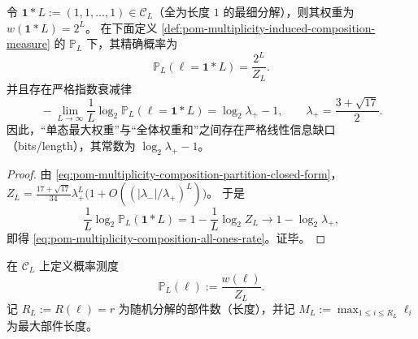 \begin{corollary}\label{cor:pom-multiplicity-composition-all-ones-exponential-rarity}
令 \(\boldsymbol{1}*L:=(1,1,\dots,1)\in\mathcal{C}_L\)（全为长度 \(1\) 的最细分解），则其权重为 \(w(\boldsymbol{1}*L)=2^L\)。
在下面定义 \ref{def:pom-multiplicity-induced-composition-measure} 的 \(\mathbb{P}_L\) 下，其精确概率为
\[
\mathbb{P}_L(\boldsymbol{\ell}=\boldsymbol{1}*L)=\frac{2^L}{Z_L}.
\]
并且存在严格指数衰减律
\begin{equation}\label{eq:pom-multiplicity-composition-all-ones-rate}
\boxed{\;
-\lim_{L\to\infty}\frac1L\log_2\mathbb{P}_L(\boldsymbol{\ell}=\boldsymbol{1}*L)
=\log_2\lambda_+-1,
\qquad \lambda_+=\frac{3+\sqrt{17}}{2}.\;}
\end{equation}
因此，“单态最大权重”与“全体权重和”之间存在严格线性信息缺口（bits/length），其常数为 \(\log_2\lambda_+-1\)。
\end{corollary}
\begin{proof}
由 \eqref{eq:pom-multiplicity-composition-partition-closed-form}，
\(
Z_L=\frac{17+\sqrt{17}}{34}\lambda_+^L\bigl(1+O((|\lambda_-|/\lambda_+)^L)\bigr)
\)。
于是
\[
\frac1L\log_2\mathbb{P}_L(\boldsymbol{1}*L)
=1-\frac1L\log_2 Z_L
\longrightarrow
1-\log_2\lambda_+,
\]
即得 \eqref{eq:pom-multiplicity-composition-all-ones-rate}。证毕。
\end{proof}

\begin{definition}[多重度诱导的典型分解测度]\label{def:pom-multiplicity-induced-composition-measure}
在 \(\mathcal{C}_L\) 上定义概率测度
\[
\mathbb{P}_L(\boldsymbol{\ell})
:=\frac{w(\boldsymbol{\ell})}{Z_L}.
\]
记 \(R_L:=R(\boldsymbol{\ell})=r\) 为随机分解的部件数（长度），并记 \(M_L:=\max_{1\le i\le R_L}\ell_i\) 为最大部件长度。
\end{definition}

